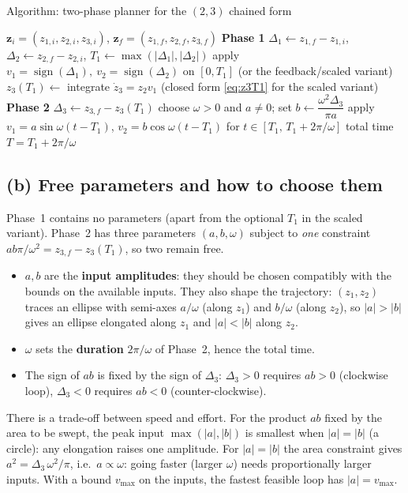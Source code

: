 \documentclass[11pt,a4paper]{article}
\theoremstyle{definition}
\theoremstyle{plain}
\theoremstyle{remark}
\newcommand{\z}{\boldsymbol{z}}
\newcommand{\sgn}{\operatorname{sign}}
\begin{document}
\begin{algbox}{Algorithm: two-phase planner for the $(2,3)$ chained form}
\begin{algorithmic}[1]
  \Require $\z_i=(z_{1,i},z_{2,i},z_{3,i})$, $\z_f=(z_{1,f},z_{2,f},z_{3,f})$
  \Statex \textbf{Phase 1}
  \State $\Delta_1\gets z_{1,f}-z_{1,i}$, $\Delta_2\gets z_{2,f}-z_{2,i}$, \; $T_1\gets\max(|\Delta_1|,|\Delta_2|)$ 
  \State apply $v_1=\sgn(\Delta_1),\ v_2=\sgn(\Delta_2)$ on $[0,T_1]$ (or the feedback/scaled variant)
  \State $z_3(T_1)\gets$ integrate $\dot z_3=z_2v_1$ (closed form \eqref{eq:z3T1} for the scaled variant)
  \Statex \textbf{Phase 2}
  \State $\Delta_3\gets z_{3,f}-z_3(T_1)$
  \State choose $\omega>0$ and $a\ne0$; set $b\gets \dfrac{\omega^2\Delta_3}{\pi a}$ 
  \State apply $v_1=a\sin\omega(t-T_1)$, $v_2=b\cos\omega(t-T_1)$ for $t\in[T_1,\,T_1+2\pi/\omega]$
  \State \Return total time $T=T_1+2\pi/\omega$
\end{algorithmic}
\end{algbox}

\subsection{(b) Free parameters and how to choose them}

Phase~1 contains no parameters (apart from the optional $T_1$ in the scaled variant). Phase~2 has three parameters $(a,b,\omega)$ subject to \emph{one} constraint $ab\pi/\omega^2=z_{3,f}-z_3(T_1)$, so two remain free.
\begin{itemize}[nosep]
  \item $a,b$ are the \textbf{input amplitudes}: they should be chosen compatibly with the bounds on the available inputs. They also shape the trajectory: $(z_1,z_2)$ traces an ellipse with semi-axes $a/\omega$ (along $z_1$) and $b/\omega$ (along $z_2$), so $|a|>|b|$ gives an ellipse elongated along $z_1$ and $|a|<|b|$ along $z_2$.
  \item $\omega$ sets the \textbf{duration} $2\pi/\omega$ of Phase~2, hence the total time.
  \item The sign of $ab$ is fixed by the sign of $\Delta_3$: $\Delta_3>0$ requires $ab>0$ (clockwise loop), $\Delta_3<0$ requires $ab<0$ (counter-clockwise).
\end{itemize}

\begin{intuition}
There is a trade-off between speed and effort. For the product $ab$ fixed by the area to be swept, the peak input $\max(|a|,|b|)$ is smallest when $|a|=|b|$ (a circle): any elongation raises one amplitude. For $|a|=|b|$ the area constraint gives $a^2=\Delta_3\,\omega^2/\pi$, i.e.\ $a\propto\omega$: going faster (larger $\omega$) needs proportionally larger inputs. With a bound $v_{\max}$ on the inputs, the fastest feasible loop has $|a|=v_{\max}$.
\end{intuition}
\end{document}

